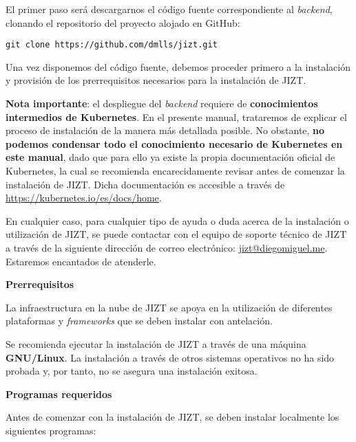 El primer paso será descargarnos el código fuente correspondiente al \emph{backend}, clonando el repositorio del proyecto alojado en GitHub:

\texttt{git clone https://github.com/dmlls/jizt.git}

Una vez disponemos del código fuente, debemos proceder primero a la instalación y provisión de los prerrequisitos necesarios para la instalación de JIZT.

\textbf{Nota importante}: el despliegue del \emph{backend} requiere de \textbf{conocimientos intermedios de Kubernetes}. En el presente manual, trataremos de explicar el proceso de instalación de la manera más detallada posible. No obstante, \textbf{no podemos condensar todo el conocimiento necesario de Kubernetes en este manual}, dado que para ello ya existe la propia documentación oficial de Kubernetes, la cual se recomienda encarecidamente revisar antes de comenzar la instalación de JIZT. Dicha documentación es accesible a través de \href{https://kubernetes.io/es/docs/home}{https://kubernetes.io/es/docs/home}.

En cualquier caso, para cualquier tipo de ayuda o duda acerca de la instalación o utilización de JIZT, se puede contactar con el equipo de soporte técnico de JIZT a través de la siguiente dirección de correo electrónico: \href{mailto:jizt@diegomiguel.me}{jizt@diegomiguel.me}. Estaremos encantados de atenderle.

\noindent
\textbf{Prerrequisitos}

La infraestructura en la nube de JIZT se apoya en la utilización de diferentes plataformas y \emph{frameworks} que se deben instalar con antelación.

Se recomienda ejecutar la instalación de JIZT a través de una máquina \textbf{GNU/Linux}. La instalación a través de otros sistemas operativos no ha sido probada y, por tanto, no se asegura una instalación exitosa.

\vspace{0.5cm}
\noindent
\textbf{Programas requeridos}

Antes de comenzar con la instalación de JIZT, se deben instalar localmente los siguientes programas:

